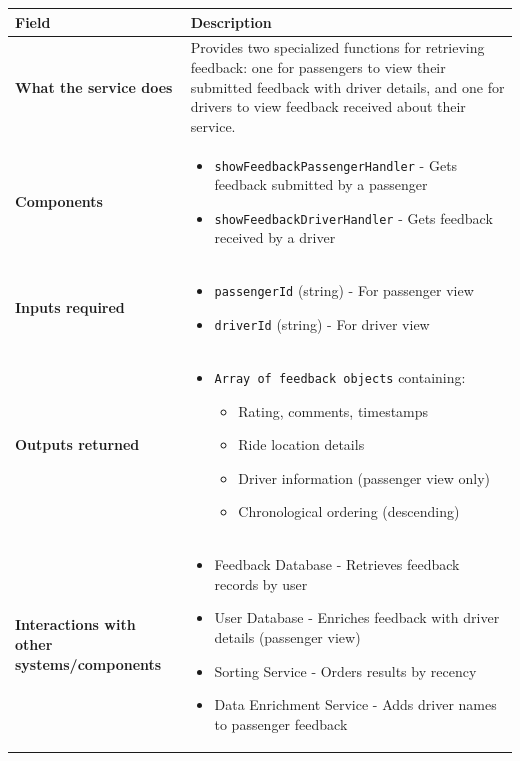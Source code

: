 \documentclass[11pt,a4paper]{article}
\begin{document}
\begin{longtable}{|p{4cm}|p{12cm}|}
\hline
\textbf{Field} & \textbf{Description} \\
\hline
\textbf{What the service does} & 
Provides two specialized functions for retrieving feedback: one for passengers to view their submitted feedback with driver details, and one for drivers to view feedback received about their service. \\
\hline
\textbf{Components} & 
\begin{itemize}[nosep]
\item \texttt{showFeedbackPassengerHandler} - Gets feedback submitted by a passenger
\item \texttt{showFeedbackDriverHandler} - Gets feedback received by a driver
\end{itemize} \\
\hline
\textbf{Inputs required} & 
\begin{itemize}[nosep]
\item \texttt{passengerId} (string) - For passenger view
\item \texttt{driverId} (string) - For driver view
\end{itemize} \\
\hline
\textbf{Outputs returned} & 
\begin{itemize}[nosep]
\item \texttt{Array of feedback objects} containing:
  \begin{itemize}[nosep]
  \item Rating, comments, timestamps
  \item Ride location details
  \item Driver information (passenger view only)
  \item Chronological ordering (descending)
  \end{itemize}
\end{itemize} \\
\hline
\textbf{Interactions with other systems/components} & 
\begin{itemize}[nosep]
\item Feedback Database - Retrieves feedback records by user
\item User Database - Enriches feedback with driver details (passenger view)
\item Sorting Service - Orders results by recency
\item Data Enrichment Service - Adds driver names to passenger feedback
\end{itemize} \\

\end{longtable}
\end{document}
